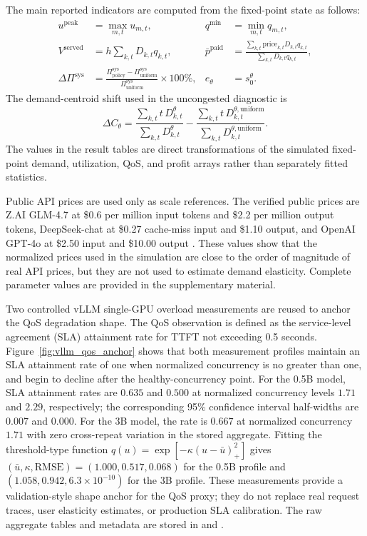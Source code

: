 \documentclass[11pt,a4paper]{article}
\newcommand{\D}{D}
\begin{document}
The main reported indicators are computed from the fixed-point state as follows:
\begin{align}
  u^{\mathrm{peak}}
  &=\max_{m,t}u_{m,t}, &
  q^{\min}
  &=\min_{m,t}q_{m,t}, \label{eq:reported_metrics}\\
  V^{\mathrm{served}}
  &=h\sum_{k,t}\D_{k,t}q_{k,t}, &
  \bar p^{\mathrm{paid}}
  &=
  \frac{\sum_{k,t}\text{price}_{k,t}\D_{k,t}q_{k,t}}
       {\sum_{k,t}\D_{k,t}q_{k,t}}, \nonumber\\
  \Delta \Pi^{\mathrm{sys}}
  &=
  \frac{\Pi^{\mathrm{sys}}_{\mathrm{policy}}-\Pi^{\mathrm{sys}}_{\mathrm{uniform}}}
       {\Pi^{\mathrm{sys}}_{\mathrm{uniform}}}\times100\%, &
  e_\theta&=s^\theta_0 . \nonumber
\end{align}
The demand-centroid shift used in the uncongested diagnostic is
\begin{equation}
  \Delta C_\theta
  =
  \frac{\sum_{k,t}t\,\D^\theta_{k,t}}{\sum_{k,t}\D^\theta_{k,t}}
  -
  \frac{\sum_{k,t}t\,\D^{\theta,\mathrm{uniform}}_{k,t}}
       {\sum_{k,t}\D^{\theta,\mathrm{uniform}}_{k,t}} .
  \label{eq:centroid_shift}
\end{equation}
The values in the result tables are direct transformations of the simulated fixed-point demand, utilization, QoS, and profit arrays rather than separately fitted statistics.

Public API prices are used only as scale references. The verified public prices are Z.AI GLM-4.7 at \$0.6 per million input tokens and \$2.2 per million output tokens, DeepSeek-chat at \$0.27 cache-miss input and \$1.10 output, and OpenAI GPT-4o at \$2.50 input and \$10.00 output \cite{zaiPricing2026,deepseekPricing2026,openaiGpt4oPricing2026}. These values show that the normalized prices used in the simulation are close to the order of magnitude of real API prices, but they are not used to estimate demand elasticity. Complete parameter values are provided in the supplementary material.

Two controlled vLLM single-GPU overload measurements are reused to anchor the QoS degradation shape. The QoS observation is defined as the service-level agreement (SLA) attainment rate for TTFT not exceeding 0.5 seconds. Figure~\ref{fig:vllm_qos_anchor} shows that both measurement profiles maintain an SLA attainment rate of one when normalized concurrency is no greater than one, and begin to decline after the healthy-concurrency point. For the 0.5B model, SLA attainment rates are $0.635$ and $0.500$ at normalized concurrency levels $1.71$ and $2.29$, respectively; the corresponding 95\% confidence interval half-widths are $0.007$ and $0.000$. For the 3B model, the rate is $0.667$ at normalized concurrency $1.71$ with zero cross-repeat variation in the stored aggregate. Fitting the threshold-type function $q(u)=\exp[-\kappa(u-\bar u)^2_+]$ gives $(\bar u,\kappa,\mathrm{RMSE})=(1.000,0.517,0.068)$ for the 0.5B profile and $(1.058,0.942,6.3\times10^{-10})$ for the 3B profile. These measurements provide a validation-style shape anchor for the QoS proxy; they do not replace real request traces, user elasticity estimates, or production SLA calibration. The raw aggregate tables and metadata are stored in  and .
\end{document}
